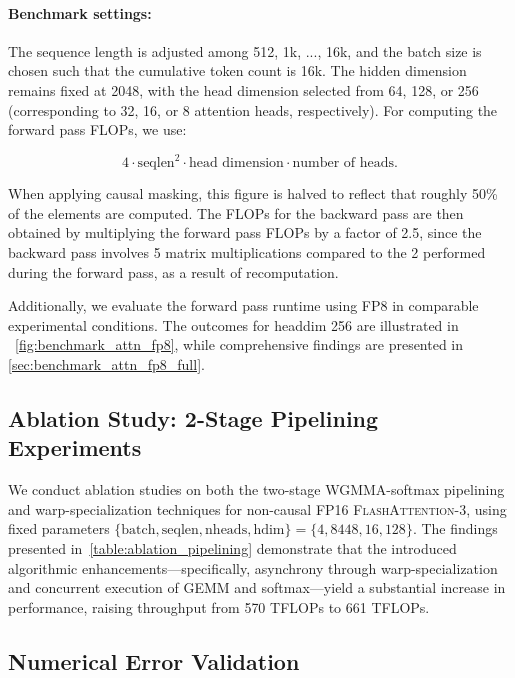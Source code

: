 \begin{algorithm}[H]
\begin{algorithmic}[1]
\paragraph{Benchmark settings:} The sequence length is adjusted among 512, 1k, ..., 16k, and the batch size is chosen such that the cumulative token count is 16k. The hidden dimension remains fixed at 2048, with the head dimension selected from 64, 128, or 256 (corresponding to 32, 16, or 8 attention heads, respectively). For computing the forward pass FLOPs, we use:

\begin{equation*}
  4 \cdot \text{seqlen}^2 \cdot \text{head dimension} \cdot \text{number of heads}.
\end{equation*}

When applying causal masking, this figure is halved to reflect that roughly 50\% of the elements are computed. The FLOPs for the backward pass are then obtained by multiplying the forward pass FLOPs by a factor of 2.5, since the backward pass involves 5 matrix multiplications compared to the 2 performed during the forward pass, as a result of recomputation.

Additionally, we evaluate the forward pass runtime using FP8 in comparable experimental conditions. The outcomes for headdim 256 are illustrated in ~\cref{fig:benchmark_attn_fp8}, while comprehensive findings are presented in \cref{sec:benchmark_attn_fp8_full}.

\subsection{Ablation Study: 2-Stage Pipelining Experiments}
\label{sec:2-stage-pipelining-experiments}

We conduct ablation studies on both the two-stage WGMMA-softmax pipelining and warp-specialization techniques for non-causal FP16 \textsc{FlashAttention-3}, using fixed parameters $\{\text{batch}, \text{seqlen}, \text{nheads}, \text{hdim}\} = \{ 4, 8448, 16, 128\}$. The findings presented in~\cref{table:ablation_pipelining} demonstrate that the introduced algorithmic enhancements—specifically, asynchrony through warp-specialization and concurrent execution of GEMM and softmax—yield a substantial increase in performance, raising throughput from 570 TFLOPs to 661 TFLOPs.

\subsection{Numerical Error Validation}
\label{sec:numerical_error}


\end{algorithmic}
\end{algorithm}
